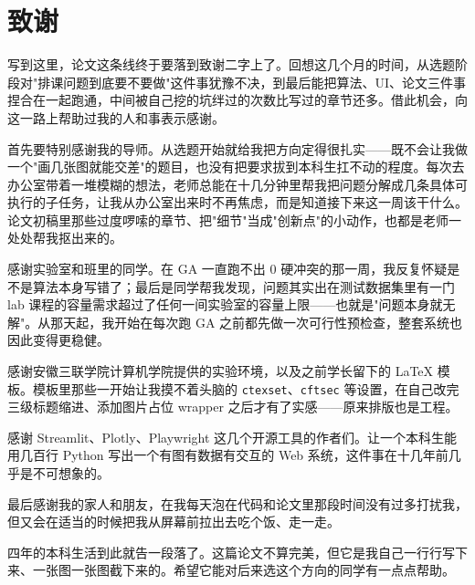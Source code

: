 \hspace*{\fill}

\section*{致谢}


写到这里，论文这条线终于要落到致谢二字上了。回想这几个月的时间，从选题阶段对"排课问题到底要不要做"这件事犹豫不决，到最后能把算法、UI、论文三件事捏合在一起跑通，中间被自己挖的坑绊过的次数比写过的章节还多。借此机会，向这一路上帮助过我的人和事表示感谢。

首先要特别感谢我的导师。从选题开始就给我把方向定得很扎实——既不会让我做一个"画几张图就能交差"的题目，也没有把要求拔到本科生扛不动的程度。每次去办公室带着一堆模糊的想法，老师总能在十几分钟里帮我把问题分解成几条具体可执行的子任务，让我从办公室出来时不再焦虑，而是知道接下来这一周该干什么。论文初稿里那些过度啰嗦的章节、把"细节"当成"创新点"的小动作，也都是老师一处处帮我抠出来的。

感谢实验室和班里的同学。在 GA 一直跑不出 0 硬冲突的那一周，我反复怀疑是不是算法本身写错了；最后是同学帮我发现，问题其实出在测试数据集里有一门 lab 课程的容量需求超过了任何一间实验室的容量上限——也就是"问题本身就无解"。从那天起，我开始在每次跑 GA 之前都先做一次可行性预检查，整套系统也因此变得更稳健。

感谢安徽三联学院计算机学院提供的实验环境，以及之前学长留下的 LaTeX 模板。模板里那些一开始让我摸不着头脑的 \texttt{ctexset}、\texttt{cftsec} 等设置，在自己改完三级标题缩进、添加图片占位 wrapper 之后才有了实感——原来排版也是工程。

感谢 Streamlit、Plotly、Playwright 这几个开源工具的作者们。让一个本科生能用几百行 Python 写出一个有图有数据有交互的 Web 系统，这件事在十几年前几乎是不可想象的。

最后感谢我的家人和朋友，在我每天泡在代码和论文里那段时间没有过多打扰我，但又会在适当的时候把我从屏幕前拉出去吃个饭、走一走。

四年的本科生活到此就告一段落了。这篇论文不算完美，但它是我自己一行行写下来、一张图一张图截下来的。希望它能对后来选这个方向的同学有一点点帮助。
